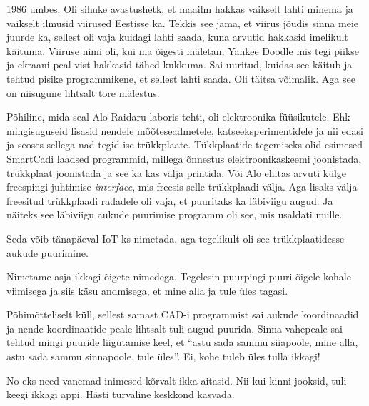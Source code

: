 1986 umbes. Oli sihuke avastushetk, et maailm hakkas vaikselt lahti minema ja vaikselt ilmusid viirused Eestisse ka. Tekkis see jama, et viirus jõudis sinna meie juurde ka, sellest oli vaja kuidagi lahti saada, kuna arvutid hakkasid imelikult käituma. Viiruse nimi oli, kui ma õigesti mäletan, Yankee Doodle mis tegi  piikse ja ekraani peal vist hakkasid tähed kukkuma. Sai uuritud, kuidas see käitub ja tehtud pisike programmikene, et sellest lahti saada. Oli täitsa võimalik. Aga see on niisugune lihtsalt tore mälestus. 

Põhiline, mida seal Alo Raidaru laboris tehti, oli elektroonika füüsikutele. Ehk mingisuguseid lisasid nendele mõõteseadmetele, katseeksperimentidele ja nii edasi ja seoses sellega nad tegid ise trükkplaate. Tükkplaatide tegemiseks olid esimesed SmartCadi laadsed programmid, millega õnnestus elektroonikaskeemi joonistada, trükkplaat joonistada ja see ka kas välja printida. Või Alo ehitas arvuti külge freespingi juhtimise \emph{interface}, mis freesis selle trükkplaadi välja. Aga lisaks välja freesitud trükkplaadi radadele oli vaja, et puuritaks ka läbiviigu augud. Ja näiteks see läbiviigu aukude puurimise programm oli see, mis usaldati mulle.


Seda võib tänapäeval IoT-ks nimetada, aga tegelikult oli see trükkplaatidesse aukude puurimine. 


Nimetame asja ikkagi õigete nimedega. Tegelesin puurpingi puuri õigele kohale viimisega ja siis käsu andmisega, et mine alla ja tule üles tagasi.


Põhimõtteliselt küll, sellest samast CAD-i programmist sai aukude koordinaadid ja nende koordinaatide peale lihtsalt tuli augud puurida. Sinna  vahepeale sai tehtud mingi puuride liigutamise keel, et \enquote{astu sada sammu siiapoole, mine alla, astu sada sammu sinnapoole, tule üles}. Ei, kohe tuleb üles tulla ikkagi! 


No eks need vanemad inimesed kõrvalt ikka aitasid. Nii kui kinni jooksid, tuli keegi ikkagi appi. Hästi turvaline keskkond kasvada.

